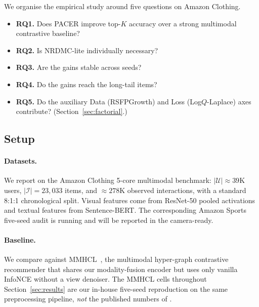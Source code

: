 \documentclass[conference]{IEEEtran}
\newcommand{\Ucal}{\mathcal{U}}
\newcommand{\Ical}{\mathcal{I}}
\begin{document}
We organise the empirical study around five questions on Amazon
Clothing.
\begin{itemize}[leftmargin=1.2em,itemsep=1pt,topsep=1pt]
  \item \textbf{RQ1.} Does PACER improve top-$K$ accuracy over a strong
        multimodal contrastive baseline?
  \item \textbf{RQ2.} Is NRDMC-lite individually necessary?
  \item \textbf{RQ3.} Are the gains stable across seeds?
  \item \textbf{RQ4.} Do the gains reach the long-tail items?
  \item \textbf{RQ5.} Do the auxiliary Data (RSFPGrowth) and Loss
        (Log$Q$-Laplace) axes contribute? (Section~\ref{sec:factorial}.)
\end{itemize}

\subsection{Setup}
\label{sec:setup}

\paragraph{Datasets.} We report on the Amazon Clothing 5-core
multimodal benchmark: $|\Ucal| \approx 39\text{K}$ users,
$|\Ical| = 23{,}033$ items, and $\approx\!278\text{K}$ observed
interactions, with a standard 8:1:1 chronological split. Visual
features come from ResNet-50 pooled activations and textual features
from Sentence-BERT. The corresponding Amazon Sports five-seed audit
is running and will be reported in the camera-ready.

\paragraph{Baseline.} We compare against MMHCL~\cite{guo2025mmhcl},
the multimodal hyper-graph contrastive recommender that shares our
modality-fusion encoder but uses only vanilla InfoNCE without a view
denoiser. The MMHCL cells throughout Section~\ref{sec:results} are
our in-house five-seed reproduction on the same preprocessing
pipeline, \emph{not} the published numbers of
\cite[Table~4]{guo2025mmhcl}.
\end{document}
